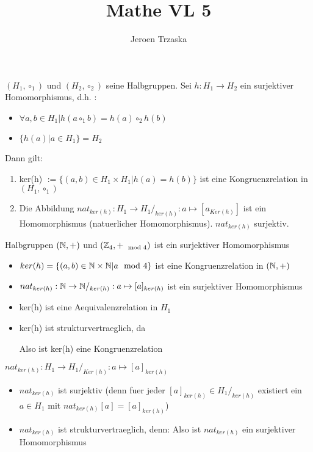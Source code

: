 \documentclass{../tudscript}
\author{Jeroen Trzaska}
\title{Mathe VL 5}
\begin{document}
$(H_1,\circ_1)$ und $(H_2,\circ_2)$ seine Halbgruppen.
Sei $h: H_1 \rightarrow H_2$ ein surjektiver Homomorphismus, d.h. :
\begin{itemize}
\item $\forall a,b \in H_1 | h(a \circ_1 b) = h(a) \circ_2 h(b)$
\item $\{h(a)|a \in H_1\} = H_2$
\end{itemize}
Dann gilt:
\begin{enumerate}
  \item ker(h) $:= \{(a,b) \in H_1 \times H_1 | h(a)=h(b)\}$ ist eine
    Kongruenzrelation in $(H_1, \circ_1)$
  \item Die Abbildung $nat_{ker(h)}: H_1 \rightarrow H_1/_{ker(h)} : a \mapsto
      [a_{Ker(h)}]$ ist ein Homomorphismus (natuerlicher Homomorphismus).
      $nat_{ker(h)}$ surjektiv.
\end{enumerate}
Halbgruppen $(\mathbb{N},+)$ und $(\mathbb{Z}_4,+_{\mod 4})$
ist ein surjektiver Homomorphismus
\begin{itemize}
\item $ker(h) = \{(a,b) \in \mathbb{N} \times \mathbb{N} | a \mod 4 \}$ ist eine
  Kongruenzrelation in $(\mathbb{N},+)$
 \item $nat_{ker(h)}: \mathbb{N} \rightarrow \mathbb{N}/_{ker(h)}: a \mapsto [a]_{ker(h)}$ ist
   ein surjektiver Homomorphismus
 \end{itemize}
 \begin{itemize}
 \item ker(h) ist eine Aequivalenzrelation in $H_1$
 \item ker(h) ist strukturvertraeglich, da \\
   
   Also ist ker(h) eine Kongruenzrelation
 \end{itemize}
 $nat_{ker(h)} : H_1 \rightarrow H_1/_{Ker(h)}: a \mapsto [a]_{ker(h)}$
 \begin{itemize}
   \item $nat_{ker(h)}$ ist surjektiv (denn fuer jeder $[a]_{ker(h)} \in H_1/_{ker(h)}$
   existiert ein $a \in H_1$ mit $nat_{ker(h)} [a] = [a]_{ker(h)}$)
 \item $nat_{ker(h)}$ ist strukturvertraeglich, denn:
 Also ist $nat_{ker(h)}$ ein surjektiver Homomorphismus
\end{itemize}
\end{document}
